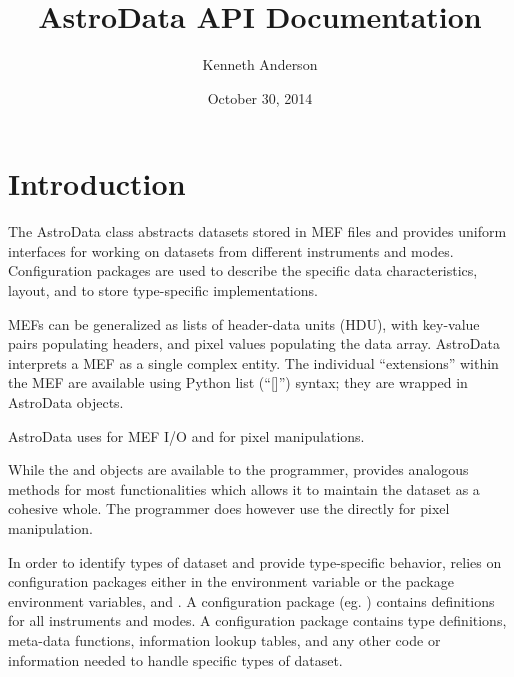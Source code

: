 \documentclass[letterpaper,10pt,english]{sphinxmanual}
\title{AstroData API Documentation}
\date{October 30, 2014}
\author{Kenneth Anderson}
\begin{document}
\maketitle
\tableofcontents
{}\label{index::doc}



\chapter{Introduction}
\label{intro:astrodata-api-documentation}\label{intro:introduction}\label{intro::doc}
The AstroData class abstracts datasets stored in MEF files
and provides uniform interfaces for working on datasets from different
instruments and modes.  Configuration packages are used to describe
the specific data characteristics, layout, and to store type-specific
implementations.

MEFs can be generalized as lists of header-data units (HDU), with key-value
pairs populating headers, and pixel values populating the data array.
AstroData interprets a MEF as a single complex entity.  The individual
``extensions'' within the MEF are available using Python list (``{[}{]}'') syntax;
they are wrapped in AstroData objects.

AstroData uses  for MEF I/O and  for pixel manipulations.

While the  and  objects are available to the programmer,
 provides analogous methods for most  functionalities
which allows it to maintain the dataset  as a cohesive whole. The programmer
does however use the  directly for pixel manipulation.

In order to identify types of dataset and provide type-specific behavior,
 relies on configuration packages either in the 
environment variable or the  package environment variables,
 and . A configuration package
(eg. ) contains definitions for all instruments and
modes. A configuration package contains type definitions, meta-data
functions, information lookup tables, and any other code
or information needed to handle specific types of dataset.
\end{document}
